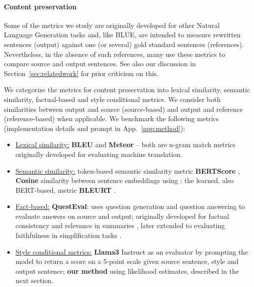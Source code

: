 \paragraph{Content preservation} Some of the metrics we study are originally developed for other Natural Language Generation tasks and, like BLUE, are intended to measure rewritten sentences (output) against one (or several) gold standard sentences (references). Nevertheless, in the absence of such references, many use these metrics to compare source and output sentences. See also our discussion in Section~\ref{sec:relatedwork} for prior criticism on this. 

We categorize the metrics for content preservation into lexical similarity, semantic similarity, factual-based and style conditional metrics. We consider both similarities between output and source (source-based) and output and reference (reference-based) when applicable. We benchmark the following metrics (implementation details and prompt in App.~\ref{app:method}):

\begin{itemize}[noitemsep]
    \item {\ul{Lexical similarity:}} \textbf{BLEU} \cite{papineni-etal-2002-bleu} and \textbf{Meteor} \cite{banerjee-lavie-2005-meteor} -- both are n-gram match metrics originally developed for evaluating machine translation. 
    \item  {\ul{Semantic similarity:}} token-based semantic similarity metric \textbf{BERTScore} \cite{zhang2019bertscore}, \textbf{Cosine} similarity between sentence embeddings using \cite{feng-etal-2022-language}; the learned, also BERT-based, metric \textbf{BLEURT} \cite{sellam-etal-2020-bleurt}.
    \item {\ul{Fact-based:}} \textbf{QuestEval}: uses question generation and question answering to evaluate answers on source and output; originally developed for factual consistency and relevance in summaries \cite{scialom-etal-2021-questeval}, later extended to evaluating faithfulness in simplification tasks \cite{scialom2021rethinking}.  
    \item {\ul{Style conditional metrics:}} \textbf{Llama3} Instruct \cite{dubey2024llama} as an evaluator by prompting the model to return a score on a 5-point scale given source sentence, style and output sentence; \textbf{our method} using likelihood estimates, described in the next section. 
\end{itemize}



